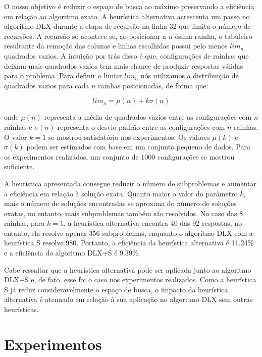 \documentclass{article}
\begin{document}
O nosso objetivo é reduzir o espaço de busca ao máximo preservando a eficiência em relação ao algoritmo
exato. A heurística alternativa acrescenta um passo no algoritmo DLX durante a etapa de recursão na linha 32
que limita o número de recursões. A recursão só acontece se, ao posicionar a $ n $-ésima rainha, o tabuleiro resultante da remoção 
das colunas e linhas escolhidas possui pelo menos $ lim_n $ quadrados vazios. A intuição por trás disso é que, configurações de rainhas que deixam mais
quadrados vazios tem mais chance de produzir respostas válidas para o problema. Para definir o limiar $ lim_n $ nós utilizamos
a distribuição de quadrados vazios para cada $ n $ rainhas posicionadas, de forma que:

\begin{equation}
lim_n = \mu(n) + k \sigma(n)
\end{equation}

onde $ \mu(n) $ representa a média de quadrados vazios entre as configurações com $ n $ rainhas e $ \sigma(n) $
representa o desvio padrão entre as configurações com $ n $ rainhas. O valor $ k = 1 $ se mostrou satisfatório nos experimentos.
Os valores $ \mu(k) $ e $ \sigma(k) $ podem ser estimados com base em um conjunto pequeno de dados. Para os experimentos realizados,
um conjunto de 1000 configurações se mostrou suficiente.

A heurística apresentada consegue reduzir o número de subproblemas e aumentar a eficiência em relação à solução
exata. Quanto maior o valor do parâmetro $ k $, mais o número de soluções encontradas se aproxima do número de soluções
exatas, no entanto, mais subproblemas também são resolvidos. No caso das 8 rainhas, para $ k = 1 $, a heurística alternativa
encontra 40 das 92 respostas, no entanto, ela resolve apenas 356 subproblemas, enquanto o algoritmo DLX com a heurística S
resolve 980. Portanto, a eficiência da heurística alternativa é 11.24\% e a eficiência do algoritmo DLX+S é
9.39\%.

Cabe ressaltar que a heurística alternativa pode ser aplicada junto ao algoritmo DLX+S e, de fato,
esse foi o caso nos experimentos realizados. Como a heurística S já reduz consideravelmente o espaço de busca, o
impacto da heurística alternativa é atenuado em relação à sua aplicação no algoritmo DLX sem outras heurísticas.

\section{Experimentos}
\end{document}
